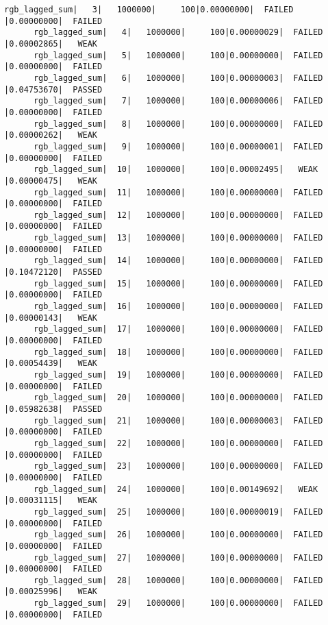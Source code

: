 \documentclass[a4paper]{article}
\begin{document}
\begin{Verbatim}[fontsize=\tiny]
      rgb_lagged_sum|   3|   1000000|     100|0.00000000|  FAILED          |0.00000000|  FAILED  
      rgb_lagged_sum|   4|   1000000|     100|0.00000029|  FAILED          |0.00002865|   WEAK   
      rgb_lagged_sum|   5|   1000000|     100|0.00000000|  FAILED          |0.00000000|  FAILED  
      rgb_lagged_sum|   6|   1000000|     100|0.00000003|  FAILED          |0.04753670|  PASSED  
      rgb_lagged_sum|   7|   1000000|     100|0.00000006|  FAILED          |0.00000000|  FAILED  
      rgb_lagged_sum|   8|   1000000|     100|0.00000000|  FAILED          |0.00000262|   WEAK   
      rgb_lagged_sum|   9|   1000000|     100|0.00000001|  FAILED          |0.00000000|  FAILED  
      rgb_lagged_sum|  10|   1000000|     100|0.00002495|   WEAK           |0.00000475|   WEAK   
      rgb_lagged_sum|  11|   1000000|     100|0.00000000|  FAILED          |0.00000000|  FAILED  
      rgb_lagged_sum|  12|   1000000|     100|0.00000000|  FAILED          |0.00000000|  FAILED  
      rgb_lagged_sum|  13|   1000000|     100|0.00000000|  FAILED          |0.00000000|  FAILED  
      rgb_lagged_sum|  14|   1000000|     100|0.00000000|  FAILED          |0.10472120|  PASSED  
      rgb_lagged_sum|  15|   1000000|     100|0.00000000|  FAILED          |0.00000000|  FAILED  
      rgb_lagged_sum|  16|   1000000|     100|0.00000000|  FAILED          |0.00000143|   WEAK   
      rgb_lagged_sum|  17|   1000000|     100|0.00000000|  FAILED          |0.00000000|  FAILED  
      rgb_lagged_sum|  18|   1000000|     100|0.00000000|  FAILED          |0.00054439|   WEAK   
      rgb_lagged_sum|  19|   1000000|     100|0.00000000|  FAILED          |0.00000000|  FAILED  
      rgb_lagged_sum|  20|   1000000|     100|0.00000000|  FAILED          |0.05982638|  PASSED  
      rgb_lagged_sum|  21|   1000000|     100|0.00000003|  FAILED          |0.00000000|  FAILED  
      rgb_lagged_sum|  22|   1000000|     100|0.00000000|  FAILED          |0.00000000|  FAILED  
      rgb_lagged_sum|  23|   1000000|     100|0.00000000|  FAILED          |0.00000000|  FAILED  
      rgb_lagged_sum|  24|   1000000|     100|0.00149692|   WEAK           |0.00031115|   WEAK   
      rgb_lagged_sum|  25|   1000000|     100|0.00000019|  FAILED          |0.00000000|  FAILED  
      rgb_lagged_sum|  26|   1000000|     100|0.00000000|  FAILED          |0.00000000|  FAILED  
      rgb_lagged_sum|  27|   1000000|     100|0.00000000|  FAILED          |0.00000000|  FAILED  
      rgb_lagged_sum|  28|   1000000|     100|0.00000000|  FAILED          |0.00025996|   WEAK   
      rgb_lagged_sum|  29|   1000000|     100|0.00000000|  FAILED          |0.00000000|  FAILED 

\end{Verbatim}
\end{document}
